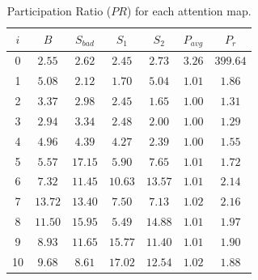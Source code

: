 \documentclass[conference]{IEEEtran}
\begin{document}
\begin{table}[h!]
\centering
\caption{Participation Ratio ($PR$) for each attention map.}
\small
    \begin{tabular}{|c|c|c|c|c|c|c|}
        \hline
        $i$ & $B$ & $S_{bad}$ & $S_1$ & $S_2$ & $P_{avg}$ & $P_r$ \\
        \hline
        0 & $2.55$ & $2.62$ & $2.45$ & $2.73$ & $3.26$ & $399.64$ \\
        1 & $5.08$ & $2.12$ & $1.70$ & $5.04$ & $1.01$ & $1.86$ \\
        2 & $3.37$ & $2.98$ & $2.45$ & $1.65$ & $1.00$ & $1.31$ \\
        3 & $2.94$ & $3.34$ & $2.48$ & $2.00$ & $1.00$ & $1.29$ \\
        4 & $4.96$ & $4.39$ & $4.27$ & $2.39$ & $1.00$ & $1.55$ \\
        5 & $5.57$ & $17.15$ & $5.90$ & $7.65$ & $1.01$ & $1.72$ \\
        6 & $7.32$ & $11.45$ & $10.63$ & $13.57$ & $1.01$ & $2.14$ \\
        7 & $13.72$ & $13.40$ & $7.50$ & $7.13$ & $1.02$ & $2.16$ \\
        8 & $11.50$ & $15.95$ & $5.49$ & $14.88$ & $1.01$ & $1.97$ \\
        9 & $8.93$ & $11.65$ & $15.77$ & $11.40$ & $1.01$ & $1.90$ \\
        10 & $9.68$ & $8.61$ & $17.02$ & $12.54$ & $1.02$ & $1.88$ \\
        \hline
    \end{tabular}
    \label{tab:imdb_pr}
\end{table}
\end{document}
